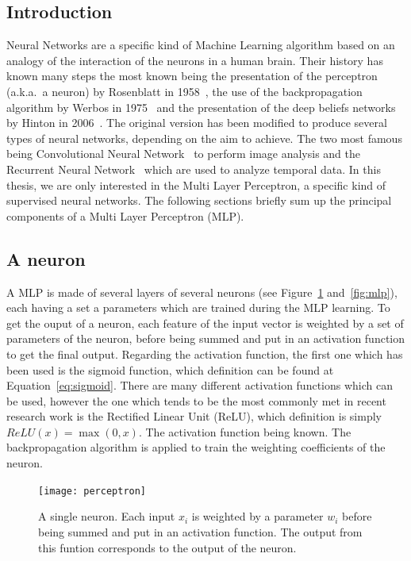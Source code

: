\subsection{Introduction}

Neural Networks are a specific kind of Machine Learning algorithm based on an analogy of the interaction of the neurons in a human brain. Their history has known many steps the most known being the presentation of the perceptron (a.k.a.\ a neuron) by Rosenblatt in 1958~\cite{rosenblatt1958perceptron}, the use of the backpropagation algorithm by Werbos in 1975~\cite{werbos1974beyond} and the presentation of the deep beliefs networks by Hinton in 2006~\cite{hinton2006fast}. The original version has been modified to produce several types of neural networks, depending on the aim to achieve. The two most famous being Convolutional Neural Network~\cite{krizhevsky2012imagenet} to perform image analysis and the Recurrent Neural Network~\cite{mikolov2010recurrent} which are used to analyze temporal data. In this thesis, we are only interested in the Multi Layer Perceptron, a specific kind of supervised neural networks. The following sections briefly sum up the principal components of a Multi Layer Perceptron (MLP). 

\subsection{A neuron}

A MLP is made of several layers of several neurons (see Figure~\ref{fig:neuron} and~\ref{fig:mlp}), each having a set a parameters which are trained during the MLP learning. To get the ouput of a neuron, each feature of the input vector is weighted by a set of parameters of the neuron, before being summed and put in an activation function to get the final output. Regarding the activation function, the first one which has been used is the sigmoid function, which definition can be found at Equation~\ref{eq:sigmoid}. There are many different activation functions which can be used, however the one which tends to be the most commonly met in recent research work is the Rectified Linear Unit (ReLU), which definition is simply $ReLU(x) = \max(0, x)$. The activation function being known. The backpropagation algorithm is applied to train the weighting coefficients of the neuron.


    \begin{figure}[h]
        \centering
        \texttt{[image: perceptron]}
        \caption{A single neuron. Each input $x_i$ is weighted by a parameter $w_i$ before being summed and put in an activation function. The output from this funtion corresponds to the output of the neuron.}
\label{fig:neuron}
    \end{figure}

